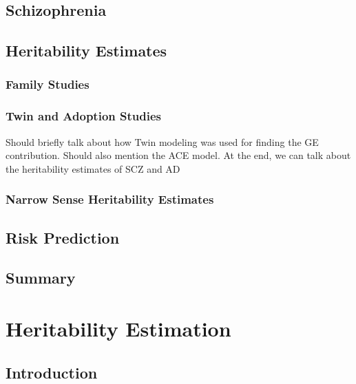 \documentclass{book}
\begin{document}
	\section{Schizophrenia}
	\subsection{}
	\section{Heritability Estimates}
	\subsection{Family Studies}
	\subsection{Twin and Adoption Studies}
	Should briefly talk about how Twin modeling was used for finding the GE contribution.
	Should also mention the ACE model.
	At the end, we can talk about the heritability estimates of SCZ and AD
	\subsection{Narrow Sense Heritability Estimates}
	\subsubsection{}
	\section{Risk Prediction}
	\section{Summary}
	
	\chapter{Heritability Estimation}
	\section{Introduction}
\end{document}
